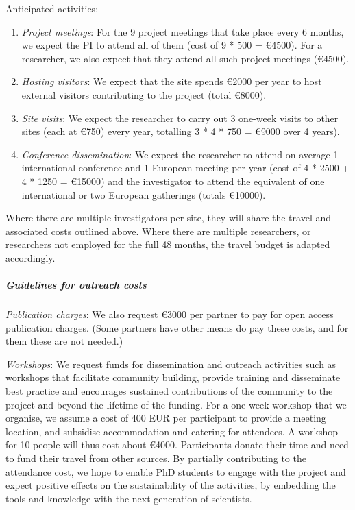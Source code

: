 Anticipated activities:

\begin{enumerate}
\item \emph{Project meetings}: For the 9 project meetings that take place every 6 months, we expect
the PI to attend all of them (cost of 9 * 500 = \euro{4500}). For
a researcher, we also expect that they attend all such project meetings
(\euro{4500}).

\item \emph{Hosting visitors}: We expect that the site spends \euro{2000} per year to host
external visitors contributing to the project (total \euro{8000}).

\item \emph{Site visits}: We expect the researcher to carry out 3 one-week visits to other sites
(each at \euro{750}) every year, totalling 3 * 4 * 750 = \euro{9000}
over 4 years).

\item
\emph{ Conference dissemination}: We expect the researcher to attend on average 1
international conference and 1 European meeting per year (cost of 4 *
2500 + 4 * 1250 = \euro{15000}) and the investigator to attend the
equivalent of one international or two
European gatherings (totals \euro{10000}).
\end{enumerate}

Where there are multiple investigators per site, they will share the
travel and associated costs outlined above. Where there are multiple
researchers, or researchers not employed for the full 48 months, the
travel budget is adapted accordingly.



\subparagraph{Guidelines for outreach costs}

\label{sect:budget-outreach-publication-charges}
\emph{Publication charges}: We also request \euro{3000} per partner to pay for open
access publication charges.  (Some partners have other means do pay
these costs, and for them these are not needed.)

\label{sect:budget-outreach-workshops}
\emph{Workshops}: We request funds for dissemination and outreach
activities such as workshops that facilitate community building,
provide training and disseminate best practice and encourages
sustained contributions of the community to the project and beyond the
lifetime of the funding. For a one-week workshop that we organise, we
assume a cost of 400 EUR per participant to provide a meeting
location, and subsidise accommodation and catering for attendees. A
workshop for 10 people will thus cost about \euro{4000}. Participants
donate their time and need to fund their travel from other sources. By
partially contributing to the attendance cost, we hope to enable PhD
students to engage with the project and expect positive effects on the
sustainability of the activities, by embedding the tools and knowledge
with the next generation of scientists.

